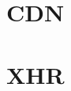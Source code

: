 
\section{CDN}

\begin{compactitem}
    \item {}
\end{compactitem}


\section{XHR}

\begin{compactitem}
    \item {}
\end{compactitem}

